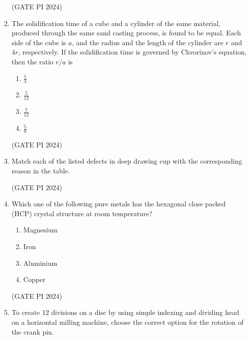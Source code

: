 \documentclass[journal,12pt,onecolumn]{IEEEtran}
\theoremstyle{remark}
\begin{document}
\begin{enumerate}
\hfill (GATE PI 2024)

\item The solidification time of a cube and a cylinder of the same material, produced through the same sand casting process, is found to be equal. Each side of the cube is $a$, and the radius and the length of the cylinder are $r$ and $4r$, respectively. If the solidification time is governed by Chvorinov's equation, then the ratio $r/a$ is

\begin{multicols}{4}
\begin{enumerate}
    \item $\frac{1}{3}$
    \item $\frac{5}{12}$
    \item $\frac{7}{12}$
    \item $\frac{5}{9}$
\end{enumerate}
\end{multicols}

\hfill (GATE PI 2024)

\item Match each of the listed defects in deep drawing cup with the corresponding reason in the table.\newline



\begin{enumerate}
\end{enumerate}

\hfill (GATE PI 2024)

\item Which one of the following pure metals has the hexagonal close packed (HCP) crystal structure at room temperature?
\begin{enumerate}
    \item Magnesium
    \item Iron
    \item Aluminium
    \item Copper
\end{enumerate}

\hfill (GATE PI 2024)

\item To create 12 divisions on a disc by using simple indexing and dividing head on a horizontal milling machine, choose the correct option for the rotation of the crank pin.


\end{enumerate}
\end{document}
